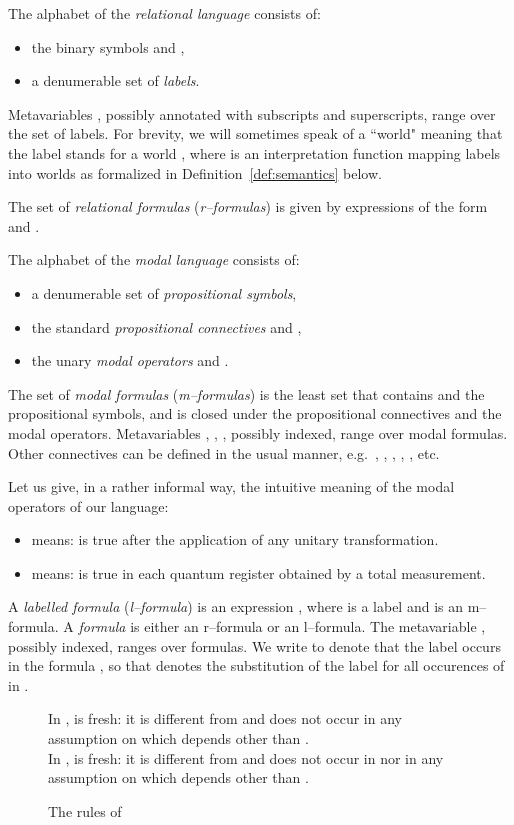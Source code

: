\documentclass[times, 10pt]{article}
\begin{document}
The alphabet of the \emph{relational language} consists of:
\begin{itemize}
\item the binary symbols  and ,
\item a denumerable set  of \textit{labels}.
\end{itemize}
Metavariables , possibly annotated with subscripts and superscripts, range over the set of 
labels.
For brevity, we will sometimes speak of a ``world"  meaning that the label  stands for a world
, where  is an interpretation function mapping labels into 
worlds as formalized in Definition~\ref{def:semantics} below.

The set of \textit{relational formulas} (\textit{r--formulas}) is given
by expressions of the form  and .

The alphabet of the \textit{modal language}  consists of:
\begin{itemize}
\item a denumerable set   of \textit{propositional symbols},
\item the standard \textit{propositional connectives}  and ,
\item the unary \textit{modal operators}  and .
\end{itemize}
The set of \emph{modal formulas} (\emph{m--formulas}) is the least
set that contains  and the propositional symbols, and is closed
under the propositional connectives and the modal operators.  
Metavariables , , , possibly indexed, range over modal formulas.
Other connectives can be defined in the usual manner, e.g.~, 
, 
,
, , etc.

Let us give, in a rather informal way, the intuitive meaning of the modal operators of our language:
\begin{itemize}
 \item  means:  is true after the application of any
   unitary transformation.
\item  means:  is true in each quantum register obtained by a total
  measurement.
\end{itemize}

A \emph{labelled formula} (\emph{l--formula}) 
is an expression , where  is a label and  is an m--formula. 
A \emph{formula} is either an r--formula or an l--formula. The metavariable , possibly 
indexed, ranges over formulas. We write  to denote that the label  occurs in the 
formula , so that  denotes the substitution of the label  for all occurences of 
 in .

\begin{figure*}[t]
  
  In ,  is fresh: it is different from  and does not occur in any assumption on which  depends other than . \\
  In ,  is fresh: it is different from  and does not occur in  nor in any assumption on which  depends other than .
  \caption{The rules of }
  \label{fig:rules}
\end{figure*}
\end{document}
